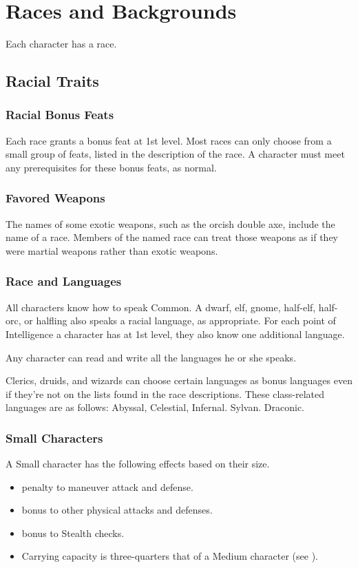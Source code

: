 \chapter{Races and Backgrounds}

Each character has a race.

\section{Racial Traits}

\subsection{Racial Bonus Feats}
Each race grants a bonus feat at 1st level. Most races can only choose from a small group of feats, listed in the description of the race. A character must meet any prerequisites for these bonus feats, as normal.

\subsection{Favored Weapons}
The names of some exotic weapons, such as the orcish double axe, include the name of a race. Members of the named race can treat those weapons as if they were martial weapons rather than exotic weapons.

\subsection{Race and Languages}
All characters know how to speak Common. A dwarf, elf, gnome, half-elf, half-orc, or halfling also speaks a racial language, as appropriate. For each point of Intelligence a character has at 1st level, they also know one additional language.

 Any character can read and write all the languages he or she speaks.

 Clerics, druids, and wizards can choose certain languages as bonus languages even if they're not on the lists found in the race descriptions. These class-related languages are as follows:
 Abyssal, Celestial, Infernal.
 Sylvan.
 Draconic.

\subsection{Small Characters}\label{Small Characters}
A Small character has the following effects based on their size.
  \begin{itemize} 
    \item {} penalty to maneuver attack and defense.
    \item {} bonus to other physical attacks and defenses.
    \item {} bonus to Stealth checks.
    \item Carrying capacity is three-quarters that of a Medium character (see ).
  \end{itemize}

